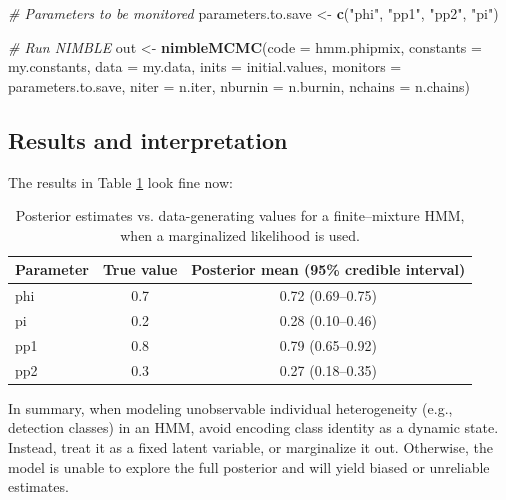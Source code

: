 \documentclass[
  12pt,
]{krantz}
\newenvironment{Shaded}{\begin{snugshade}}{\end{snugshade}}
\newcommand{\AttributeTok}[1]{\textcolor[rgb]{0.13,0.29,0.53}{#1}}
\newcommand{\CommentTok}[1]{\textcolor[rgb]{0.56,0.35,0.01}{\textit{#1}}}
\newcommand{\FunctionTok}[1]{\textcolor[rgb]{0.13,0.29,0.53}{\textbf{#1}}}
\newcommand{\NormalTok}[1]{#1}
\newcommand{\OtherTok}[1]{\textcolor[rgb]{0.56,0.35,0.01}{#1}}
\newcommand{\StringTok}[1]{\textcolor[rgb]{0.31,0.60,0.02}{#1}}
\begin{document}
\begin{Shaded}
\begin{Highlighting}[]
\CommentTok{\# Parameters to be monitored}
\NormalTok{parameters.to.save }\OtherTok{\textless{}{-}} \FunctionTok{c}\NormalTok{(}\StringTok{"phi"}\NormalTok{, }\StringTok{"pp1"}\NormalTok{, }\StringTok{"pp2"}\NormalTok{, }\StringTok{"pi"}\NormalTok{)}

\CommentTok{\# Run NIMBLE}
\NormalTok{out }\OtherTok{\textless{}{-}} \FunctionTok{nimbleMCMC}\NormalTok{(}\AttributeTok{code =}\NormalTok{ hmm.phipmix, }
                  \AttributeTok{constants =}\NormalTok{ my.constants,}
                  \AttributeTok{data =}\NormalTok{ my.data,              }
                  \AttributeTok{inits =}\NormalTok{ initial.values,}
                  \AttributeTok{monitors =}\NormalTok{ parameters.to.save,}
                  \AttributeTok{niter =}\NormalTok{ n.iter,}
                  \AttributeTok{nburnin =}\NormalTok{ n.burnin, }
                  \AttributeTok{nchains =}\NormalTok{ n.chains)}
\end{Highlighting}
\end{Shaded}

\subsection{Results and interpretation}\label{results-and-interpretation-5}

The results in Table \ref{tab:okidh} look fine now:

\begin{table}

\caption{\label{tab:okidh}Posterior estimates vs. data-generating values for a finite--mixture HMM, when a marginalized likelihood is used.}
\centering
\begin{tabular}[t]{l|c|c}
\hline
Parameter & True value & Posterior mean (95\% credible interval)\\
\hline
phi & 0.7 & 0.72 (0.69–0.75)\\
\hline
pi & 0.2 & 0.28 (0.10–0.46)\\
\hline
pp1 & 0.8 & 0.79 (0.65–0.92)\\
\hline
pp2 & 0.3 & 0.27 (0.18–0.35)\\
\hline
\end{tabular}
\end{table}

In summary, when modeling unobservable individual heterogeneity (e.g., detection classes) in an HMM, avoid encoding class identity as a dynamic state. Instead, treat it as a fixed latent variable, or marginalize it out. Otherwise, the model is unable to explore the full posterior and will yield biased or unreliable estimates.
\end{document}
